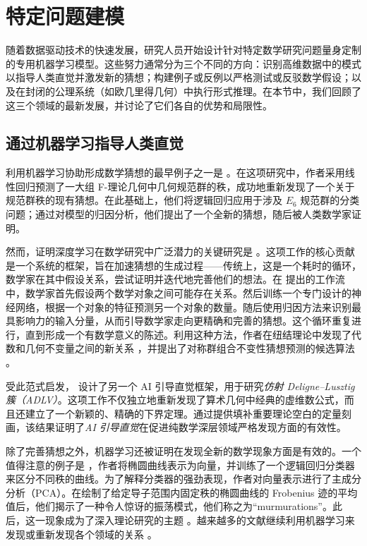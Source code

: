 \documentclass[11pt]{article}
\numberwithin{equation}{section}
\begin{document}
\section{特定问题建模}\label{sec:psm}
随着数据驱动技术的快速发展，研究人员开始设计针对特定数学研究问题量身定制的专用机器学习模型。这些努力通常分为三个不同的方向：识别高维数据中的模式以指导人类直觉并激发新的猜想；构建例子或反例以严格测试或反驳数学假设；以及在封闭的公理系统（如欧几里得几何）中执行形式推理。在本节中，我们回顾了这三个领域的最新发展，并讨论了它们各自的优势和局限性。


\subsection{通过机器学习指导人类直觉}

利用机器学习协助形成数学猜想的最早例子之一是 \cite{carifio2017machine}。在这项研究中，作者采用线性回归预测了一大组 F-理论几何中几何规范群的秩，成功地重新发现了一个关于规范群秩的现有猜想。在此基础上，他们将逻辑回归应用于涉及 $E_6$ 规范群的分类问题；通过对模型的归因分析，他们提出了一个全新的猜想，随后被人类数学家证明。

然而，证明深度学习在数学研究中广泛潜力的关键研究是 \cite{davies2021advancing}。这项工作的核心贡献是一个系统的框架，旨在加速猜想的生成过程——传统上，这是一个耗时的循环，数学家在其中假设关系，尝试证明并迭代地完善他们的想法。在 \cite{davies2021advancing} 提出的工作流中，数学家首先假设两个数学对象之间可能存在关系。然后训练一个专门设计的神经网络，根据一个对象的特征预测另一个对象的数量。随后使用归因方法来识别最具影响力的输入分量，从而引导数学家走向更精确和完善的猜想。这个循环重复进行，直到形成一个有数学意义的陈述。利用这种方法，作者在纽结理论中发现了代数和几何不变量之间的新关系 \cite{davies2024signature}，并提出了对称群组合不变性猜想预测的候选算法 \cite{blundell2022towards}。

受此范式启发，\cite{dong2024machine} 设计了另一个 AI 引导直觉框架，用于研究\textit{仿射 Deligne--Lusztig 簇（ADLV）}。这项工作不仅独立地重新发现了算术几何中经典的虚维数公式，而且还建立了一个新颖的、精确的下界定理。通过提供填补重要理论空白的定量刻画，该结果证明了\textit{AI 引导直觉}在促进纯数学深层领域严格发现方面的有效性。

除了完善猜想之外，机器学习还被证明在发现全新的数学现象方面是有效的。一个值得注意的例子是 \cite{he2025murmurations}，作者将椭圆曲线表示为向量，并训练了一个逻辑回归分类器来区分不同秩的曲线。为了解释分类器的强劲表现，作者对向量表示进行了主成分分析（PCA）。在绘制了给定导子范围内固定秩的椭圆曲线的 Frobenius 迹的平均值后，他们揭示了一种令人惊讶的振荡模式，他们称之为“murmurations”。此后，这一现象成为了深入理论研究的主题 \cite{zubrilina2025murmurations,lee2025murmurations,bober2025murmurations}。越来越多的文献继续利用机器学习来发现或重新发现各个领域的关系 \cite{carifio2017machine,KLAEWER2019438,PhysRevD.103.126014,doi:10.1142/S0217751X25500976,PhysRevD.105.066002,Lee01052025,doi:10.1142/S2810939223500016,PhysRevD.110.046016,shalyt2024unsupervised,lanard2025algorithm,lee2025machines}。
\end{document}
